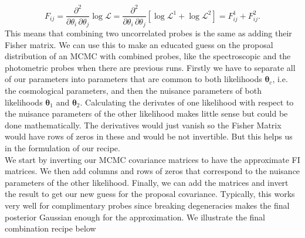 \documentclass[../main.tex]{subfiles}
\begin{document}
\begin{equation}
    F_{ij} = \frac{\partial^2}{\partial \theta_i\,\partial \theta_j} \log \mathcal{L} = \frac{\partial^2}{\partial \theta_i\,\partial \theta_j} \left[\log \mathcal{L}^1 + \log\mathcal{L}^2\right] = F^1_{ij} + F^2_{ij}.
\end{equation}
This means that combining two uncorrelated probes is the same as adding their Fisher matrix. We can use this to make an educated guess on the proposal distribution of an MCMC with combined probes, like the spectroscopic and the photometric probes when there are previous runs. Firstly we have to separate all of our parameters into parameters that are common to both likelihoods $\boldsymbol{\theta}_c$, i.e. the cosmological parameters, and then the nuisance parameters of both likelihoods $\boldsymbol{\theta}_1$ and $\boldsymbol{\theta}_2$. Calculating the derivates of one likelihood with respect to the nuisance parameters of the other likelihood makes little sense but could be done mathematically. The derivatives would just vanish so the Fisher Matrix would have rows of zeros in these and would be not invertible. But this helps us in the formulation of our recipe.\\
We start by inverting our MCMC covariance matrices to have the approximate FI matrices. We then add columns and rows of zeros that correspond to the nuisance parameters of the other likelihood. Finally, we can add the matrices and invert the result to get our new guess for the proposal covariance. Typically, this works very well for complimentary probes since breaking degeneracies makes the final posterior Gaussian enough for the approximation. We illustrate the final combination recipe below 
\end{document}
